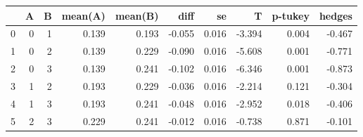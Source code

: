 \begin{tabular}{lrrrrrrrrr}
\toprule
{} &  A &  B &  mean(A) &  mean(B) &   diff &     se &      T &  p-tukey &  hedges \\
\midrule
0 &  0 &  1 &    0.139 &    0.193 & -0.055 &  0.016 & -3.394 &    0.004 &  -0.467 \\
1 &  0 &  2 &    0.139 &    0.229 & -0.090 &  0.016 & -5.608 &    0.001 &  -0.771 \\
2 &  0 &  3 &    0.139 &    0.241 & -0.102 &  0.016 & -6.346 &    0.001 &  -0.873 \\
3 &  1 &  2 &    0.193 &    0.229 & -0.036 &  0.016 & -2.214 &    0.121 &  -0.304 \\
4 &  1 &  3 &    0.193 &    0.241 & -0.048 &  0.016 & -2.952 &    0.018 &  -0.406 \\
5 &  2 &  3 &    0.229 &    0.241 & -0.012 &  0.016 & -0.738 &    0.871 &  -0.101 \\
\bottomrule
\end{tabular}
